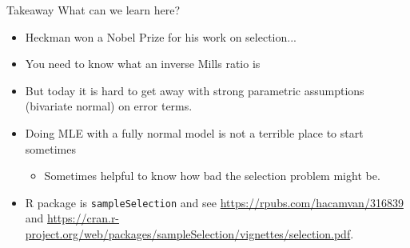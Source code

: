 \documentclass[xcolor=pdftex,dvipsnames,table,mathserif,aspectratio=169]{beamer}
\begin{document}
\begin{frame}{Takeaway}
What can we learn here?
\begin{itemize}
\item Heckman won a Nobel Prize for his work on selection...
\item You need to know what an \alert{inverse Mills ratio is}
\item But today it is hard to get away with strong parametric assumptions (bivariate normal) on error terms.
\item Doing MLE with a fully normal model is not a terrible place to start sometimes
\begin{itemize}
\item Sometimes helpful to know how bad the selection problem might be.
\end{itemize}
\item R package is \texttt{sampleSelection} and see \url{https://rpubs.com/hacamvan/316839} and \url{https://cran.r-project.org/web/packages/sampleSelection/vignettes/selection.pdf}.
\end{itemize}
\end{frame}
\end{document}
